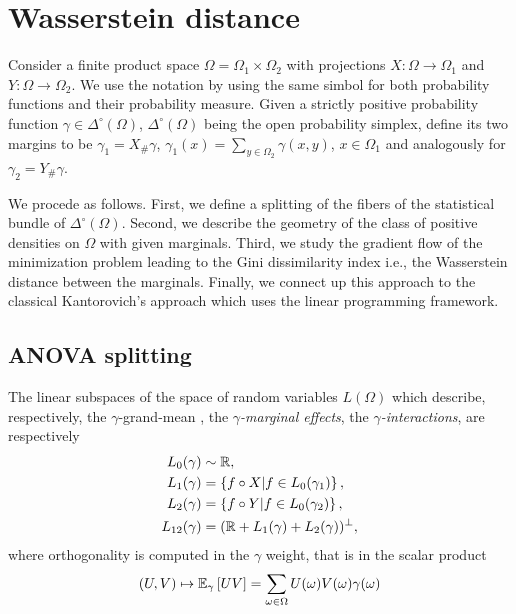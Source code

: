 \documentclass[12pt,a4paper]{amsart}
\begin{document}
\section{Wasserstein distance}
\label{sec:wasserstein}

Consider a finite product space $\Omega = \Omega_1 \times \Omega_2$ with projections $X \colon \Omega \to \Omega_1$ and $Y \colon \Omega \to \Omega_2$. We use the notation by using the same simbol for both probability functions and their probability measure. Given a strictly positive probability function $\gamma \in \Delta^\circ(\Omega)$, $\Delta^\circ(\Omega)$ being the open probability simplex, define its two margins to be $\gamma_1 = X_\# \gamma$, $\gamma_1(x) = \sum_{y \in \Omega_2} \gamma(x,y)$, $x \in\Omega_1$ and analogously for $\gamma_2 = Y_\# \gamma$. 

We procede as follows. First, we define a splitting of the fibers of the statistical bundle of $\Delta^\circ(\Omega)$. Second, we describe the geometry of the class of positive densities on $\Omega$ with given marginals. Third, we study the gradient flow of the minimization problem leading to the Gini dissimilarity index i.e., the Wasserstein distance between the marginals. Finally, we connect up this approach to the classical Kantorovich's approach which uses the linear programming framework.

\subsection{ANOVA splitting}
%
The linear subspaces of the space of random variables $L(\Omega)$ which describe, respectively, the $\gamma$-grand-mean , the \emph{$\gamma$-marginal effects}, the \emph{$\gamma$-interactions}, are respectively
%
\begin{equation}\label{eq:ANOVA-spaces}
\begin{aligned}
  L_0(\gamma) &\sim \mathbb R, \\
  L_1(\gamma) &= \left\{ f\circ X \middle| f \in L_0(\gamma_1) \right\},\\
  L_2(\gamma) &= \left\{ f\circ Y \middle| f \in L_0(\gamma_2) \right\},\\
  L_{12}(\gamma) &= (\mathbb R + L_1(\gamma) + L_2(\gamma))^\perp,
\end{aligned}
\end{equation}
%
where orthogonality is computed in the $\gamma$ weight, that is in the scalar product
%
\begin{equation*}
(U,V) \mapsto {\operatorname{\mathbb E}}_{\gamma}\left[UV\right] = \sum_{\omega\in\Omega}U(\omega)V(\omega)
\gamma(\omega)\end{equation*}
\end{document}
